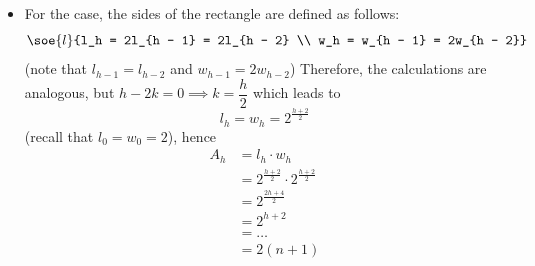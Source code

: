 \documentclass[a4paper, 12pt]{report}
\begin{document}
{\begin{itemize}
\begin{equation*}
\begin{split}
                            &= 2^\frac{h - 1}{2} \cdot w_1 \\
                            &= 2^\frac{h - 1}{2} \cdot 4 \\
                            &= 2^{\frac{h - 1}{2} + 2} \\
                            &= 2^\frac{h + 3}{2}
                    \end{split}
                \end{equation*}
                Hence, the area is
                \begin{equation*}
                    \begin{split}
                        A_h &= l_h \cdot w_h \\
                            &= 2^\frac{h + 1}{2} \cdot 2^\frac{h + 3}{2} \\
                            &= 2^\frac{2h + 4}{2} \\
                            &= 2^{h + 2} \quad \quad (h = \log (n + 1) - 1) \\
                            &= 2^{\log(n + 1) -1 +2} \\
                            &= 2^{\log(n + 1) +1} \\
                            &= 2(n + 1)
                    \end{split}
                \end{equation*}
            \item For the  case, the sides of the rectangle are defined as follows: $$\soe{l}{l_h = 2l_{h - 1} = 2l_{h - 2} \\ w_h = w_{h - 1} = 2w_{h - 2}}$$ (note that $l_{h - 1} = l_{h - 2}$ and $w_{h - 1} = 2w_{h - 2}$) Therefore, the calculations are analogous, but $h - 2k = 0 \implies k = \dfrac{h}{2}$ which leads to $$l_h = w_h = 2^\frac{h + 2}{2}$$ (recall that $l_0 = w_0 = 2$), hence
                \begin{equation*}
                    \begin{split}
                        A_h &= l_h \cdot w_h \\
                            &= 2^\frac{h + 2}{2} \cdot 2^\frac{h + 2}{2} \\
                            &= 2^\frac{2h + 4}{2} \\
                            &= 2^{h + 2} \\
                            &= \ldots \\
                            &= 2(n + 1)
                    \end{split}
                \end{equation*}
        \end{itemize}
    }
\end{document}
